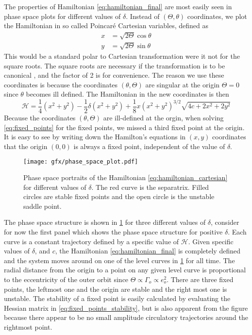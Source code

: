 The properties of Hamiltonian \ref{eq:hamiltonian_final} are most easily seen
in phase space plots for different values of $\delta$. Instead of $(\Theta,\theta)$ 
coordinates, we plot the Hamiltonian
in so called Poincaré Cartesian variables, defined as 
\begin{equation}
    \begin{aligned}
        x&=\sqrt{2\Theta}\cos\theta\\
        y&=\sqrt{2\Theta}\sin\theta
    \end{aligned}
\end{equation}
This would be a standard polar to Cartesian transformation were it not for the 
square roots. The square roots are necessary if the transformation is to be 
canonical \citep{sylvio}, and the factor of 2 is for convenience. The reason
we use these coordinates is because the coordinates $(\theta,\Theta)$ are
singular at the origin $\Theta=0$ since $\theta$ becomes ill defined. 
The Hamiltonian in the new coordinates is then
\begin{equation}
    \mathcal{H}= \frac{1}{4}\left( x^2+y^2\right) - \frac{1}{2}\delta\left(
    x^2+y^2\right)+ \frac{1}{8} x\left(x^2+y^2\right)^{3/2}\sqrt{4c+2x^2+2y^2}
    \label{eq:hamiltonian_cartesian}
\end{equation}
Because the coordinates $(\theta,\Theta)$ are ill-defined at the orgin, when
solving \cref{eq:fixed_points} for the fixed points, we missed a third fixed 
point at the origin. It is easy to see by writing down the Hamilton's
equations in $(x,y)$ coordinates that the origin $(0,0)$ is always a fixed
point, independent of the value of $\delta$.
\begin{figure}
\centering
\texttt{[image: gfx/phase\_space\_plot.pdf]}
    \caption{Phase space portraits of the Hamiltonian 
    \ref{eq:hamiltonian_cartesian} for different values of 
    $\delta$. The red curve
    is the separatrix. Filled circles are stable fixed points and the open
    circle is the unstable saddle point.}
\label{fig:phase_space}
\end{figure}

The phase space structure is shown in \cref{fig:phase_space} for three different
values of $\delta$, consider for now the first panel which shows the phase space
structure for positive $\delta$. Each curve is a constant trajectory defined by a specific value
of $\mathcal{H}$. Given specific values of $\delta$, and $c$, the Hamiltonian 
\ref{eq:hamiltonian_final} is completely defined and the system moves around on
one of the level curves in \cref{fig:phase_space} for all time. The radial distance
from the origin to a point on any given level curve is proportional to the eccentricity
of the outer orbit since $\Theta\propto
\Gamma_o\propto e_o^2$. There are three fixed points, the
leftmost one and the origin are stable and the right most one is unstable. The 
stability of a fixed point is easily calculated by evaluating the Hessian matrix in
\cref{eq:fixed_points_stability}, but is also apparent from the figure because there
appear to be no small amplitude circulatory trajectories around the rightmost point. 

